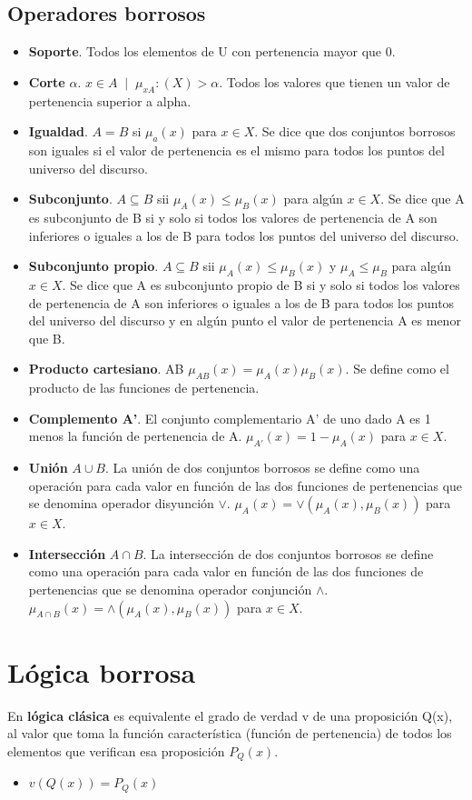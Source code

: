 \documentclass[12pt, twoside, openright]{report} %
\begin{document}
\subsection{Operadores borrosos}
\begin{itemize}
	\item \textbf{Soporte}. Todos los elementos de U con pertenencia mayor que 0.
	\item \textbf{Corte} $\alpha$. $x \in A \;\;| \;\; \mu_{xA}:(X)>\alpha$. Todos los valores que tienen un valor de pertenencia superior a alpha.
	\item \textbf{Igualdad}. $A=B$ si $\mu_a(x)$ para $x\in X$. Se dice que dos conjuntos borrosos son iguales si el valor de pertenencia es el mismo para todos los puntos del universo del discurso.
	\item \textbf{Subconjunto}. $A \subseteq B$ sii $\mu_A(x)\leq \mu_B(x)$ para algún $x\in X$. Se dice que A es subconjunto de B si y solo si todos los valores de pertenencia de A son inferiores o iguales a los de B para todos los puntos del universo del discurso.
	\item \textbf{Subconjunto propio}. $A \subseteq B$ sii $\mu_A(x)\leq \mu_B(x)$ y $\mu_A\leq \mu_B$ para algún $x\in X$. Se dice que A es subconjunto propio de B si y solo si todos los valores de pertenencia de A son inferiores o iguales a los de B para todos los puntos del universo del discurso y en algún punto el valor de pertenencia A es menor que B.
	\item \textbf{Producto cartesiano}. AB $\mu_{AB}(x)=\mu_A(x)\mu_B(x)$. Se define como el producto de las funciones de pertenencia.
	\item \textbf{Complemento A'}. El conjunto complementario A’ de uno dado A es 1 menos la función de pertenencia de A. $\mu_{A'}(x)=1-\mu_A(x)$ para $x \in X$.
	\item \textbf{Unión} $A \cup B$. La unión de dos conjuntos borrosos se define como una operación para cada valor en función de las dos funciones de pertenencias que se denomina operador disyunción $\vee$. $\mu_A(x)=\vee(\mu_A(x),\mu_B(x))$ para $x\in X$.
	\item \textbf{Intersección} $A \cap B$. La intersección de dos conjuntos borrosos se define como una operación para cada valor en función de las dos funciones de pertenencias que se denomina operador conjunción $\wedge$. $\mu_{A \cap B}(x)=\wedge(\mu_A(x),\mu_B(x))$ para $x\in X$.
\end{itemize}

\section{Lógica borrosa}
En \textbf{lógica clásica} es equivalente el grado de verdad v de una proposición Q(x), al valor que toma la función característica (función de pertenencia) de todos los elementos que verifican esa proposición $P_Q(x)$.
\begin{itemize}
	\item $v(Q(x)) = P_Q(x)$
\end{itemize}
\end{document}
